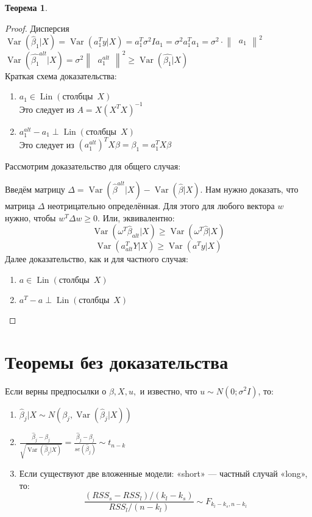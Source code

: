 \documentclass[12pt]{article} %
\theoremstyle{definition} %
\newtheorem{theorem}{Теорема}[section]
\DeclareMathOperator{\Var}{Var}
\DeclareMathOperator{\Lin}{Lin}
\begin{document}
\begin{theorem}
\begin{proof}
Дисперсия $\Var(\hat{\beta}_1|X)=\Var(a_1^Ty|X)=a_1^T\sigma^2Ia_1=\sigma^2a_1^Ta_1=\sigma^2\cdot
\begin{Vmatrix}
  \ a_1
\end{Vmatrix}^2$\\
$\Var(\hat{\beta_1}^{alt}|X)=\sigma^2
\begin{Vmatrix}
  \ a_1^{alt}

\end{Vmatrix}^2 \geq \Var(\hat{\beta_1}|X)$\\

Краткая схема доказательства:
\begin{enumerate}
    \item $a_1 \in \Lin(\text{столбцы}\enspace X)$\\
Это следует из $A=X(X^TX)^{-1}$
    \item $a_1^{alt}-a_1 \perp \Lin(\text{столбцы} \enspace X)$\\
Это следует из $(a_1^{alt})^TX\beta=\beta_1=a_1^TX\beta$
\end{enumerate}
Рассмотрим доказательство для общего случая:

Введём матрицу $\Delta=\Var(\hat{\beta}^{alt}|X)-\Var(\hat{\beta}|X)$.
Нам нужно доказать, что матрица $\Delta$ неотрицательно определённая.
Для этого для любого вектора $w$ нужно, чтобы $w^T \Delta w \geq 0$.
Или, эквивалентно:
\[
\Var(\omega^T \hat{\beta}_{alt}|X) \geq \Var(\omega^T \hat{\beta}|X)
\]
\[
\Var(a_{alt}^TY|X) \geq \Var(a^Ty|X)
\]
Далее доказательство, как и для частного случая:
\begin{enumerate}
    \item $a \in \Lin(\text{столбцы} \enspace X)$
    \item $a^T-a \perp \Lin(\text{столбцы} \enspace X)$
\end{enumerate}
\end{proof}
\end{theorem}

\section{Теоремы без доказательства}
Если верны предпосылки о $\beta, X, u,$ и известно, что $u \sim N(0;\sigma^2I)$, то:
\begin{enumerate}
    \item $\hat{\beta}_j|X \sim N(\beta_j, \Var(\hat{\beta}_j|X))$
    \item $\frac{\hat{\beta}_j-\beta_j}{\sqrt{\Var(\hat{\beta}_j|X)}}=\frac{\hat{\beta}_j-\beta_j}{se(\hat{\beta}_j)} \sim t_{n-k}$
    \item Если существуют две вложенные модели: «short» — частный случай «long», то:
    \[
\frac{(RSS_s-RSS_l)/(k_l-k_s)}  {RSS_l/(n-k_l)} \sim F_{k_l-k_s,n-k_l}
\]
\end{enumerate}
\end{document}
